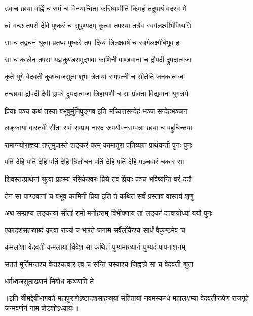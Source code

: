 \twolineshloka
{उवाच छाया वह्निं च रामं च विनयान्विता}
{करिष्यामीति किमहं तदुपायं वदस्व मे} %


\twolineshloka
{त्वं गच्छ तपसे देवि पुष्करं च सुपुण्यदम्}
{कृत्वा तपस्या तत्रैव स्वर्गलक्ष्मीर्भविष्यसि} %

\twolineshloka
{सा च तद्वचनं श्रुत्वा प्रतप्य पुष्करे तपः}
{दिव्यं त्रिलक्षवर्षं च स्वर्गलक्ष्मीर्बभूव ह} %

\twolineshloka
{सा च कालेन तपसा यज्ञकुण्डसमुद्‍भवा}
{कामिनी पाण्डवानां च द्रौपदी द्रुपदात्मजा} %

\twolineshloka
{कृते युगे वेदवती कुशध्वजसुता शुभा}
{त्रेतायां रामपत्‍नी च सीतेति जनकात्मजा} %

\twolineshloka
{तच्छाया द्रौपदी देवी द्वापरे द्रुपदात्मजा}
{त्रिहायणी च सा प्रोक्ता विद्यमाना युगत्रये} %


\twolineshloka
{प्रियाः पञ्च कथं तस्या बभूवुर्मुनिपुङ्‌गव}
{इति मच्चित्तसन्देहं भञ्ज सन्देहभञ्जन} %



\twolineshloka
{लङ्‌कायां वास्तवी सीता रामं सम्प्राप नारद}
{रूपयौवनसम्पन्ना छाया च बहुचिन्तया} %

\twolineshloka
{रामाग्न्योराज्ञया तप्तुमुपास्ते शङ्‌करं परम्}
{कामातुरा पतिव्यग्रा प्रार्थयन्ती पुनः पुनः} %

\twolineshloka
{पतिं देहि पतिं देहि पतिं देहि त्रिलोचन}
{पतिं देहि पतिं देहि पञ्चवारं चकार सा} %

\twolineshloka
{शिवस्तत्प्रार्थनां श्रुत्वा प्रहस्य रसिकेश्वरः}
{प्रिये तव प्रियाः पञ्च भविष्यन्ति वरं ददौ} %

\twolineshloka
{तेन सा पाण्डवानां च बभूव कामिनी प्रिया}
{इति ते कथितं सर्वं प्रस्तावं वास्तवं शृणु} %

\twolineshloka
{अथ सम्प्राप्य लङ्‌कायां सीतां रामो मनोहराम्}
{विभीषणाय तां लङ्‌कां दत्त्वायोध्यां ययौ पुनः} %

\twolineshloka
{एकादशसहस्राब्दं कृत्वा राज्यं च भारते}
{जगाम सर्वैर्लोकैश्च सार्धं वैकुण्ठमेव च} %

\twolineshloka
{कमलांशा वेदवती कमलायां विवेश सा}
{कथितं पुण्यमाख्यानं पुण्यदं पापनाशनम्} %

\twolineshloka
{सततं मूर्तिमन्तश्च वेदाश्चत्वार एव च}
{सन्ति यस्याश्च जिह्वाग्रे सा च वेदवती श्रुता} %

\onelineshloka
{धर्मध्वजसुताख्यानं निबोध कथयामि ते}%

॥इति श्रीमद्देवीभागवते महापुराणेऽष्टादशसाहस्र्यां संहितायां नवमस्कन्धे महालक्षम्या वेदवतीरूपेण राजगृहे जन्मवर्णनं नाम षोडशोऽध्यायः॥

\closesection